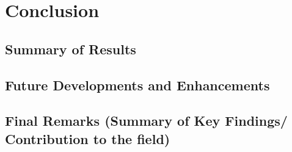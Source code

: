
\chapter{Conclusion}\label{chapter:conclusion}

\section{Summary of Results}
\section{Future Developments and Enhancements}
\section{Final Remarks (Summary of Key Findings/ Contribution to the field)}
